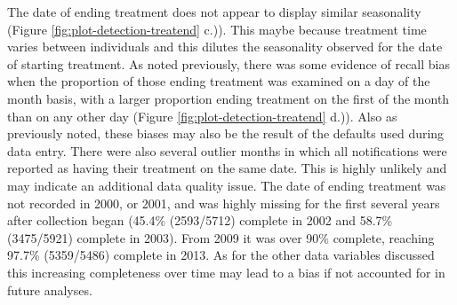\documentclass[11pt,twoside]{bristolthesis}
\begin{document}
  The date of ending treatment does not appear to display similar seasonality (Figure \ref{fig:plot-detection-treatend} c.)). This maybe because treatment time varies between individuals and this dilutes the seasonality observed for the date of starting treatment. As noted previously, there was some evidence of recall bias when the proportion of those ending treatment was examined on a day of the month basis, with a larger proportion ending treatment on the first of the month than on any other day (Figure \ref{fig:plot-detection-treatend} d.)). Also as previously noted, these biases may also be the result of the defaults used during data entry. There were also several outlier months in which all notifications were reported as having their treatment on the same date. This is highly unlikely and may indicate an additional data quality issue. The date of ending treatment was not recorded in 2000, or 2001, and was highly missing for the first several years after collection began (45.4\% (2593/5712) complete in 2002 and 58.7\% (3475/5921) complete in 2003). From 2009 it was over 90\% complete, reaching 97.7\% (5359/5486) complete in 2013. As for the other data variables discussed this increasing completeness over time may lead to a bias if not accounted for in future analyses.
\end{document}
